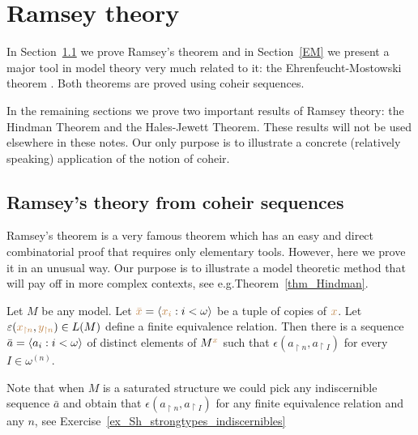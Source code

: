 \chapter{Ramsey theory}
\label{ramsey}

In Section~\ref{Ramsey} we prove Ramsey's theorem and in Section~\ref{EM} we present a major tool in model theory very much related to it: the Ehrenfeucht-Mostowski theorem .
Both theorems are proved using coheir sequences.

In the remaining sections we prove two important results of Ramsey theory: the Hindman Theorem and the Hales-Jewett Theorem.
These results will not be used elsewhere in these notes.
Our only purpose is to illustrate a concrete (relatively speaking) application of the notion of coheir.

\def\medrel#1{\parbox[t]{6ex}{$\displaystyle\hfil #1$}}
\def\ceq#1#2#3{\parbox[t]{12ex}{$\displaystyle #1$}\medrel{#2}{$\displaystyle #3$}}

\section{Ramsey's theory from coheir sequences}
\label{Ramsey}
Ramsey's theorem is a very famous theorem which has an easy and direct combinatorial proof that requires only elementary tools.
However, here we prove it in an unusual way.
Our purpose is to illustrate a model theoretic method that will pay off in more complex contexts, see e.g.\@ Theorem~\ref{thm_Hindman}.

\begin{lemma}\label{lem_Ramsey}
  Let $M$ be any model.
  Let ${\color{brown}\bar x}=\langle{\color{brown}x_i}:i<\omega\rangle$ be a tuple of copies of ${\color{brown} x}$.
  Let $\varepsilon({\color{brown} x_{\restriction n}},{\color{brown} y_{\restriction n}})\in L(M)$ define a finite equivalence relation.
  Then there is a sequence $\bar a=\langle a_i:i<\omega\rangle$ of distinct elements of $M^{\color{brown} x}$ such that $\epsilon({a_{\restriction n}},a_{\restriction I})$ for every $I\in\omega^{(n)}$.
\end{lemma}

Note that when $M$ is a saturated structure we could pick any indiscernible sequence $\bar a$ and obtain that $\epsilon(a_{\restriction n},a_{\restriction I})$ for any finite equivalence relation and any $n$, see Exercise~\ref{ex_Sh_strongtypes_indiscernibles}

